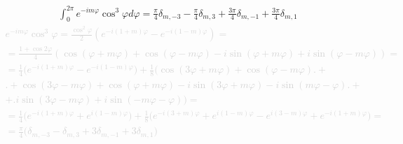 %
\begin{equation} \begin{aligned}
\int_{0}^{2\pi} e^{-i m \varphi} \cos^3 \varphi d \varphi = 
\frac{\pi}{4} \delta_{m,-3} - \frac{\pi}{4} \delta_{m,3} + 
\frac{3 \pi}{4} \delta_{m,-1} + \frac{3 \pi}{4} \delta_{m,1}
\end{aligned} \end{equation}
%
\textcolor{lightgray}{ \begin{equation*} \begin{aligned}
e^{-i m \varphi} \cos^3 \varphi = 
\frac{ \cos^2 \varphi } { 2 } 
\left( e^{-i (1+m) \varphi} - e^{-i (1-m) \varphi} \right) = \\
= \frac{ 1 + \cos 2 \varphi } { 4 } 
\left( \cos (\varphi + m \varphi) + \cos (\varphi - m \varphi) - 
i \sin (\varphi + m \varphi) + i \sin (\varphi - m \varphi) \right) = \\
= \frac{1}{4} \big( e^{-i(1+m) \varphi} - e^{-i(1-m) \varphi} \big) + \frac{1}{8} 
\big( \cos (3 \varphi + m \varphi) + \cos (\varphi - m \varphi) \big. + \\
\big. + \cos (3 \varphi - m \varphi) + \cos (\varphi + m \varphi) -
i \sin (3 \varphi + m \varphi) - i \sin (m \varphi - \varphi) \big. + \\
+ \big. i \sin (3 \varphi - m \varphi) + i \sin (- m \varphi - \varphi) \big) = \\
= \frac{1}{4} \big( e^{-i(1+m) \varphi} + e^{i(1-m) \varphi} \big) + 
\frac{1}{8} \big( e^{-i (3+m) \varphi} + e^{i (1-m) \varphi} - 
e^{i (3-m) \varphi} + e^{-i (1+m) \varphi} \big) = \\
= \frac{\pi}{4} \big( \delta_{m,-3} - \delta_{m,3} +
3 \delta_{m,-1} + 3 \delta_{m,1} \big)
\end{aligned} \end{equation*} }
